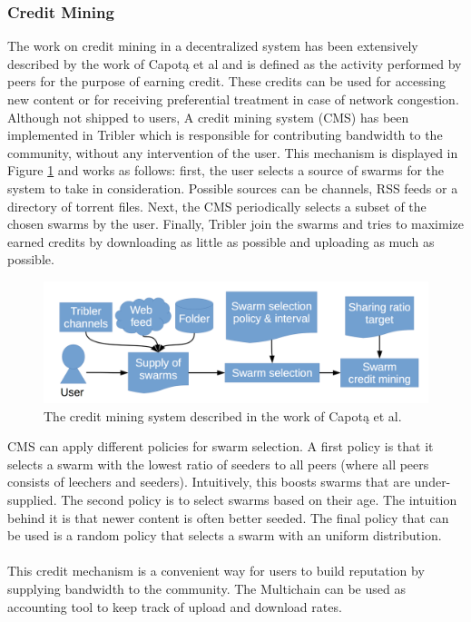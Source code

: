 \subsubsection{\textbf{Credit Mining}}
The work on credit mining in a decentralized system has been extensively described by the work of Capot\k{a} et al\cite{capotka2015decentralized} and is defined as the activity performed by peers for the purpose of earning credit. These credits can be used for accessing new content or for receiving preferential treatment in case of network congestion. Although not shipped to users, A credit mining system (CMS) has been implemented in Tribler which is responsible for contributing bandwidth to the community, without any intervention of the user. This mechanism is displayed in Figure \ref{fig:credit-mining} and works as follows: first, the user selects a source of swarms for the system to take in consideration. Possible sources can be channels, RSS feeds or a directory of torrent files. Next, the CMS periodically selects a subset of the chosen swarms by the user. Finally, Tribler join the swarms and tries to maximize earned credits by downloading as little as possible and uploading as much as possible.\\

\begin{figure}[h!]
	\centering
	\includegraphics[width=0.7\columnwidth]{images/architecture/credit_mining}
	\caption{The credit mining system described in the work of Capot\k{a} et al.}
	\label{fig:credit-mining}
\end{figure}

CMS can apply different policies for swarm selection. A first policy is that it selects a swarm with the lowest ratio of seeders to all peers (where all peers consists of leechers and seeders). Intuitively, this boosts swarms that are under-supplied. The second policy is to select swarms based on their age. The intuition behind it is that newer content is often better seeded. The final policy that can be used is a random policy that selects a swarm with an uniform distribution.\\\\
This credit mechanism is a convenient way for users to build reputation by supplying bandwidth to the community. The Multichain can be used as accounting tool to keep track of upload and download rates.

